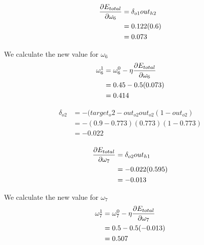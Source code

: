 \documentclass[10pt,a4paper]{article}
\begin{document}
\begin{equation}
\begin{split}
\pdv{E_{total}}{\omega_6} &= \delta_{o1}out_{h2}\\
                          &= 0.122(0.6)\\
                          &= 0.073\\
\end{split}
\end{equation}

We calculate the new value for $\omega_6$
\begin{equation}
\begin{split}
\omega_6^1 &= \omega_6^0 - \eta\pdv{E_{total}}{\omega_6}\\
           &= 0.45 -0.5(0.073)\\
           &= 0.414\\
\end{split}
\end{equation}

\begin{equation}
\begin{split}
\delta_{o2} &= -(target_o2 -out_{o2}out_{o2}(1-out_{o2})\\
            &= -(0.9-0.773)(0.773)(1-0.773)\\
            &= -0.022\\
\end{split}
\end{equation}

\begin{equation}
\begin{split}
\pdv{E_{total}}{\omega_7} &= \delta_{o2}out_{h1}\\
                          &= -0.022(0.595)\\
                          &= -0.013\\
\end{split}
\end{equation}

We calculate the new value for $\omega_7$
\begin{equation}
\begin{split}
\omega_7^1 &= \omega_7^0 - \eta\pdv{E_{total}}{\omega_7}\\
           &= 0.5 -0.5(-0.013)\\
           &= 0.507\\
\end{split}
\end{equation}
\end{document}
